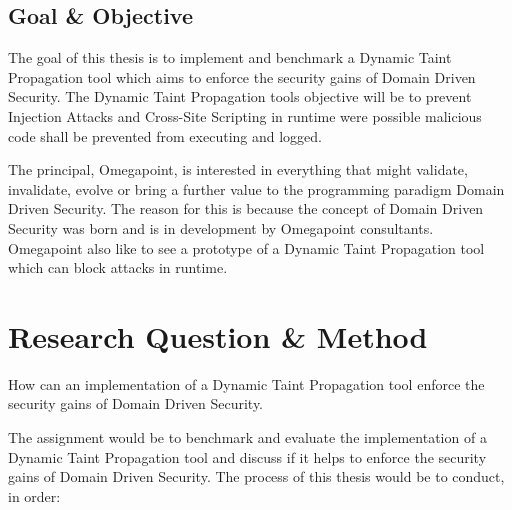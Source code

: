 \documentclass{../kththesis}
\begin{document}
	
	\section{Goal \& Objective}
	The goal of this thesis is to implement and benchmark a Dynamic Taint Propagation tool which aims to enforce the security gains of Domain Driven Security. The Dynamic Taint Propagation tools objective will be to prevent Injection Attacks and Cross-Site Scripting in runtime were possible malicious code shall be prevented from executing and logged.
	
	The principal, Omegapoint, is interested in everything that might validate, invalidate, evolve or bring a further value to the programming paradigm Domain Driven Security. The reason for this is because the concept of Domain Driven Security was born and is in development by Omegapoint consultants. Omegapoint also like to see a prototype of a Dynamic Taint Propagation tool which can block attacks in runtime.
	
	
	
	\chapter{Research Question \& Method} \label{ResearchQuestionMethod}
	\begin{chapquote}{}
		How can an implementation of a Dynamic Taint Propagation tool enforce the security gains of Domain Driven Security.
	\end{chapquote}
	
	\noindent
	The assignment would be to benchmark and evaluate the implementation of a Dynamic Taint Propagation tool and discuss if it helps to enforce the security gains of Domain Driven Security. The process of this thesis would be to conduct, in order:
	
\end{document}
